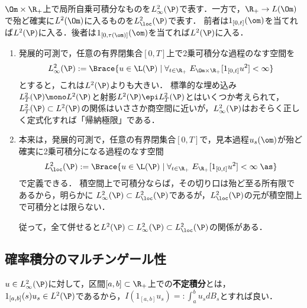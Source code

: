 \documentclass[uplatex,dvipdfmx]{jsreport}
\begin{document}
\begin{notation}
    $\Om\times\R_+$上で局所自乗可積分なものを$L^2_\infty(\P)$で表す．一方で，$\R_+\to L(\Om)$で殆ど確実に$L^2(\Om)$に入るものを$L^2_\loc(\P)$で表す．
    前者は$1_{[0,t]}(\om)$を当てれば$L^2(\P)$に入る．後者は$1_{[0,\tau(\om)]}(\om)$を当てれば$L^2(\P)$に入る．
    \begin{enumerate}
        \item 
        発展的可測で，任意の有界閉集合$[0,T]$上で2乗可積分な過程のなす空間を
        \[L^2_\infty(\P):=\Brace{u\in\L(\P)\mid\forall_{t\in\R_+}\;E_{\Om\times\R_+}[1_{[0,t]}u^2]<\infty}\]
        とすると，これは$L^2(\P)$よりも大きい．
        標準的な埋め込み$L^2_T(\P)\mono L^2(\P)$と射影$L^2(\P)\epi L^2_T(\P)$とはいくつか考えられて，
        $L^2_T(\P)\subset L^2(\P)$の関係はいささか商空間に近いが，$L^2_\infty(\P)$はおそらく正しく定式化すれば「帰納極限」である．
        \item 本来は，発展的可測で，任意の有界閉集合$[0,T]$で，見本過程$u_s(\om)$が殆ど確実に2乗可積分になる過程のなす空間
        \[L^2_\loc(\P):=\Brace{u\in\L(\P)\mid\forall_{t\in\R_+}\;E_{\R_+}[1_{[0,t]}u^2]<\infty\;\as}\]
        で定義できる．
        積空間上で可積分ならば，その切り口は殆ど至る所有限であるから，明らかに
        $L^2_\infty(\P)\subset L^2_\loc(\P)$であるが，$L^2_\loc(\P)$の元が積空間上で可積分とは限らない．
        
        従って，全て併せると$L^2(\P)\subset L^2_\infty(\P)\subset L^2_\loc(\P)$の関係がある．
    \end{enumerate}
\end{notation}

\subsection{確率積分のマルチンゲール性}

\begin{definition}
    $u\in L^2_\infty(\P)$に対して，区間$[a,b]\subset\R_+$上での\textbf{不定積分}とは，
    $1_{[a,b]}(s)u_s\in L^2(\P)$であるから，$I(1_{[a,b]}u_s)=:\int^b_au_sdB_s$とすれば良い．
\end{definition}
\end{document}

